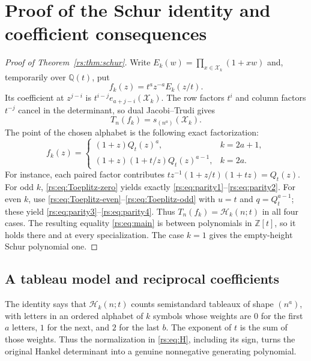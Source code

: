 \documentclass[11pt]{article}
\theoremstyle{definition}
\theoremstyle{remark}
\newcommand{\Z}{\mathbb Z}
\newcommand{\Q}{\mathbb Q}
\newcommand{\Ht}{\mathcal H}
\newcommand{\XX}{\mathcal X}
\theoremstyle{definition}
\theoremstyle{plain}
\numberwithin{equation}{section}
\begin{document}
\section{Proof of the Schur identity and coefficient consequences}
\label{rs:sec:schurproof}
\begin{proof}[Proof of Theorem~\ref{rs:thm:schur}]
Write $E_k(w)=\prod_{x\in\XX_k}(1+xw)$ and, temporarily over $\Q(t)$, put
\begin{equation}
 f_k(z)=t^a z^{-a}E_k(z/t).
 \label{rs:eq:fk}
\end{equation}
Its coefficient at $z^{j-i}$ is $t^{i-j}e_{a+j-i}(\XX_k)$.
The row factors $t^i$ and column factors $t^{-j}$ cancel in the determinant,
so dual Jacobi--Trudi gives
\begin{equation}
 T_n(f_k)=s_{(n^a)}(\XX_k).
 \label{rs:eq:Tschur}
\end{equation}
The point of the chosen alphabet is the following exact factorization:
\begin{equation}
 f_k(z)=
 \begin{cases}
 (1+z)Q_t(z)^a,&k=2a+1,\\
 (1+z)(1+t/z)Q_t(z)^{a-1},&k=2a.
 \end{cases}
 \label{rs:eq:symbol}
\end{equation}
For instance, each paired factor contributes
$t z^{-1}(1+z/t)(1+tz)=Q_t(z)$.
For odd $k$, \eqref{rs:eq:Toeplitz-zero} yields exactly
\eqref{rs:eq:parity1}--\eqref{rs:eq:parity2}. For even $k$, use
\eqref{rs:eq:Toeplitz-even}--\eqref{rs:eq:Toeplitz-odd} with $u=t$ and
$q=Q_t^{a-1}$; these yield \eqref{rs:eq:parity3}--\eqref{rs:eq:parity4}.
Thus $T_n(f_k)=\Ht_k(n;t)$ in all four cases.
The resulting equality \eqref{rs:eq:main} is between polynomials in $\Z[t]$,
so it holds there and at every specialization. The case $k=1$ gives the
empty-height Schur polynomial one.
\end{proof}

\subsection{A tableau model and reciprocal coefficients}
The identity says that $\Ht_k(n;t)$ counts semistandard tableaux of shape
$(n^a)$, with letters in an ordered alphabet of $k$ symbols whose weights are
$0$ for the first $a$ letters, $1$ for the next, and $2$ for the last $b$.
The exponent of $t$ is the sum of those weights. Thus the normalization in
\eqref{rs:eq:H}, including its sign, turns the original Hankel determinant into
a genuine nonnegative generating polynomial.
\end{document}

